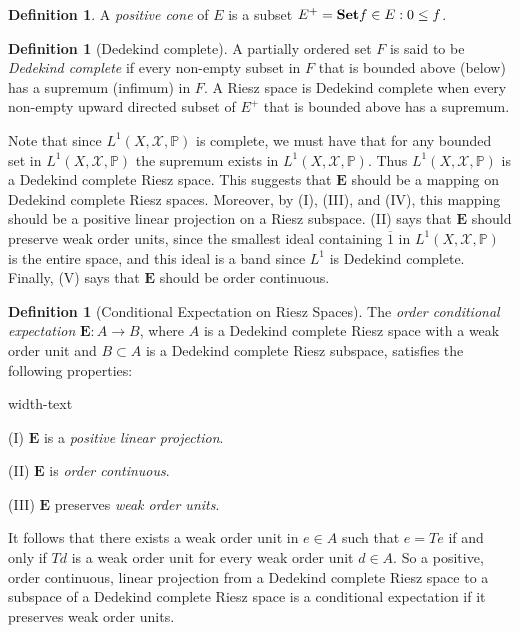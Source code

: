 \documentclass[letterpaper,10pt,oneside,onecolumn,reqno]{amsart}
\renewcommand{\P}{\mathbb P}
\newcommand{\X}{\mathcal X}
\theoremstyle{definition}
\newtheorem{defn}[thm]{Definition}
\newcommand{\catname}[1]{{\normalfont\textbf{#1}}}
\newcommand{\Set}{\catname{Set}}
\renewcommand{\bar}[1]{\overline{#1}}
\begin{document}
\begin{defn}\label{def:16}
A \emph{positive cone} of $E$ is a subset $E^+ = \Set{f \in E : 0 \leq f}$.
\end{defn}


\begin{defn}[Dedekind complete]\label{def:17}
A partially ordered set $F$ is said to be \emph{Dedekind complete} if every non-empty subset in $F$ that is bounded above (below) has a supremum (infimum) in $F$. A Riesz space is Dedekind complete when every non-empty upward directed subset of $E^+$ that is bounded above has a supremum.
\end{defn}


Note that since $L^1(X,\X,\P)$ is complete, we must have that for any bounded set in $L^1(X,\X,\P)$ the supremum exists in $L^1(X,\X,\P)$. Thus $L^1(X,\X,\P)$ is a Dedekind complete Riesz space. This suggests that $\mathbf{E}$ should be a mapping on Dedekind complete Riesz spaces. Moreover, by (I), (III), and (IV), this mapping should be a positive linear projection on a Riesz subspace. (II) says that $\mathbf{E}$ should preserve weak order units, since the smallest ideal containing $\bar{1}$ in $L^1(X,\X,\P)$ is the entire space, and this ideal is a band since $L^1$ is Dedekind complete. Finally, (V) says that $\mathbf{E}$ should be order continuous. 

\begin{defn}[Conditional Expectation on Riesz Spaces]\label{def:18}
The \emph{order conditional expectation} $\mathbf{E}: A \to B$, where $A$ is a Dedekind complete Riesz space with a weak order unit and $B \subset A$ is a Dedekind complete Riesz subspace, satisfies the following properties:

\begin{deflist}{width-text}
\item[(I)] $\mathbf{E}$ is a \emph{positive linear projection}.
\item[(II)] $\mathbf{E}$ is \emph{order continuous}.
\item[(III)] $\mathbf{E}$ preserves \emph{weak order units}.
\end{deflist}

It follows that there exists a weak order unit in $e \in A$ such that $e = Te$ if and only if $Td$ is a weak order unit for every weak order unit $d \in A$. So a positive, order continuous, linear projection from a Dedekind complete Riesz space to a subspace of a Dedekind complete Riesz space is a conditional expectation if it preserves weak order units.
\end{defn}
\end{document}
